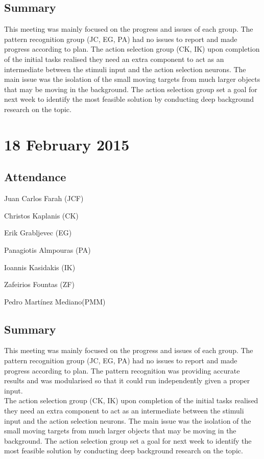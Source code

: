 \documentclass[a4paper,11pt]{article}
\begin{document}
\subsection*{Summary}
This meeting was mainly focused on the progress and issues of each group. The pattern recognition group (JC, EG, PA) had no issues to report and made progress according to plan. The action selection group (CK, IK) upon completion of the initial tasks realised they need an extra component to act as an intermediate between the stimuli input and the action selection neurons. The main issue was the isolation of the small moving targets from much larger objects that may be moving in the background. The action selection group set a goal for next week to identify the most feasible solution by conducting deep background research on the topic.

\maketitle
\section*{18 February 2015}
\subsection*{Attendance}
\begin{compactenum}
\item Juan Carlos Farah (JCF)
\item Christos Kaplanis (CK)
\item Erik Grabljevec (EG)
\item Panagiotis Almpouras (PA)
\item Ioannis Kasidakis (IK)
\item Zafeirios Fountas (ZF)
\item Pedro Martínez Mediano(PMM)
\end{compactenum}

\subsection*{Summary}
This meeting was mainly focused on the progress and issues of each group. The pattern recognition group (JC, EG, PA) had no issues to report and made progress according to plan. The pattern recognition was providing accurate results and was modularised so that it could run independently given a proper input.
\\ The action selection group (CK, IK) upon completion of the initial tasks realised they need an extra component to act as an intermediate between the stimuli input and the action selection neurons. The main issue was the isolation of the small moving targets from much larger objects that may be moving in the background. The action selection group set a goal for next week to identify the most feasible solution by conducting deep background research on the topic.
\end{document}
